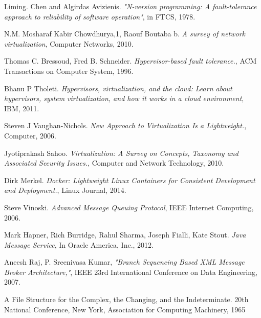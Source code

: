 \documentclass[a4paper,11pt,twoside]{report}
\begin{document}
\begin{thebibliography}{1}
 	 Liming. Chen and Algirdas Avizienis. {\em  "N-version programming: A fault-tolerance approach to reliability of software operation"}, in FTCS, 1978. 
   
	 N.M. Mosharaf Kabir Chowdhurya,1, Raouf Boutaba b. {\em A survey of network virtualization}, Computer Networks, 2010.
   
	 Thomas C. Bressoud, Fred B. Schneider. {\em Hypervisor-based fault tolerance.}, ACM 	Transactions on Computer System, 1996.
	   
  	 Bhanu P Tholeti. {\em Hypervisors, virtualization, and the cloud: Learn about hypervisors, system virtualization, and how it works in a cloud environment}, IBM, 2011. 

	  Steven J Vaughan-Nichols. {\em New Approach to Virtualization Is a Lightweight.}, Computer, 2006.  
	 
	   Jyotiprakash Sahoo. {\em Virtualization: A Survey on Concepts, Taxonomy and Associated Security Issues.}, Computer and Network Technology, 2010.
  
    Dirk Merkel. {\em Docker: Lightweight Linux Containers for Consistent Development and Deployment.}, Linux Journal, 2014.
	
	 Steve Vinoski. {\em Advanced Message Queuing Protocol}, IEEE Internet Computing, 2006. 

     Mark Hapner, Rich Burridge, Rahul Sharma, Joseph Fialli, Kate Stout. {\em Java Message Service}, In Oracle America, Inc., 2012.

 Aneesh Raj, P. Sreenivasa Kumar, {\em "Branch Sequencing Based XML Message Broker Architecture,"}, IEEE 23rd International Conference on Data Engineering, 2007.  

 A File Structure for the Complex, the Changing, and the Indeterminate. 20th National Conference, New York, Association for Computing Machinery, 1965
\end{thebibliography} 
\end{document}
